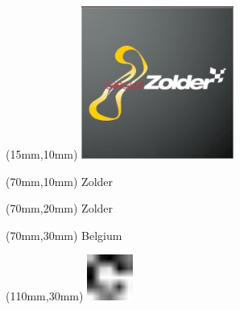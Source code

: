 \null\newpage
\begin{textblock*}{50mm}(15mm,10mm)%
\includegraphics[width=50mm]{LG/2015-05-20_00100.png}
\end{textblock*}
\begin{textblock*}{130mm}(70mm,10mm)%
{\fontsize{20}{20}\selectfont Zolder}\\
\end{textblock*}
\begin{textblock*}{120mm}(70mm,20mm)%
{\fontsize{16}{16}\selectfont Zolder}\\
\end{textblock*}
\begin{textblock*}{120mm}(70mm,30mm)%
{\fontsize{12}{12}\selectfont Belgium}
\end{textblock*}
\begin{textblock*}{30mm}(110mm,30mm)%
\centering
\includegraphics[height=15mm]{icons/fa-rotate-right.pdf}
\end{textblock*}

